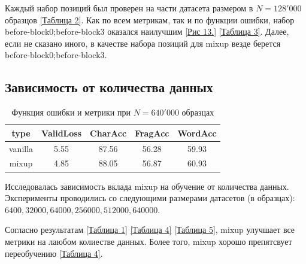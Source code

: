 Каждый набор позиций был проверен на части датасета размером в $N = 128'000$ образцов \hyperref[tab:mixup_position]{[Таблица 2]}. Как по всем метрикам, так и по функции ошибки, набор before-block0;before-block3 оказался наилучшим \hyperlink{image13}{[Рис 13.]} \hyperref[tab:mixup_position_metrics]{[Таблица 3]}. Далее, если не сказано иного, в качестве набора позиций для mixup везде берется before-block0;before-block3.

\newpage
\subsection{Зависимость от количества данных}

\begin{table}[]
\centering
\begin{tabular}{||c c c c c||} 
 \hline
 type & ValidLoss & CharAcc & FragAcc & WordAcc \\ [0.5ex] 
 \hline\hline
 vanilla & 5.55 & 87.56 & 56.28 & 59.93\\ 
 \hline
 mixup & 4.85 & 88.05 & 56.87 & 60.93\\ [1ex] 
 \hline
\end{tabular}
\caption{Функция ошибки и метрики при $N = 640'000$ образцах}
\label{tab:mixup_size_max}
\end{table}

Исследовалась зависимость вклада mixup на обучение от количества данных. Эксперименты проводились со следующими размерами датасетов (в образцах):\\ $6400, 32000, 64000, 256000, 512000, 640000$.

Согласно результатам \hyperref[tab:mixup_size_max]{[Таблица 1]} \hyperref[tab:mixup_size]{[Таблица 4]} \hyperref[tab:mixup_size_all]{[Таблица 5]}, mixup улучшает все метрики на лаюбом колиестве данных. Более того, mixup хорошо препятсвует переобучению \hyperref[tab:mixup_size]{[Таблица 4]}. 

\newpage
